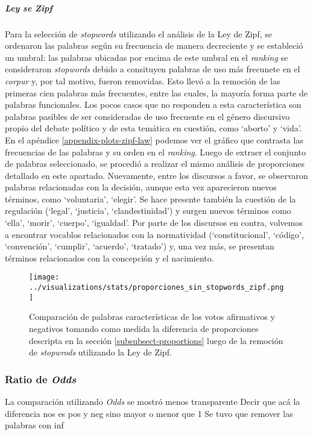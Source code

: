 \subparagraph{Ley se Zipf}
Para la selección de \textit{stopwords} utilizando el análisis de la Ley de Zipf,
se ordenaron las palabras según su frecuencia de manera decreciente y se estableció
un umbral: las palabras ubicadas por encima de este umbral en el \textit{ranking}
se consideraron \textit{stopwords} debido a consituyen palabras de uso más
frecunete en el \textit{corpur} y, por tal motivo, fueron removidas.
Esto llevó a la remoción de las primeras cien palabras más frecuentes, entre 
las cuales, la mayoría forma parte de palabras funcionales.
Los pocos casos que no responden a esta característica son palabras pasibles de
ser consideradas de uso frecuente en el género discursivo propio del debate político
y de esta temática en cuestión, como `aborto' y `vida'.
En el apéndice \ref{appendix-plots-zipf-law} podemos ver el gráfico que contrasta
las frecuencias de las palabras y su orden en el \textit{ranking}.
Luego de extraer el conjunto de palabras seleccionado, se procedió a realizar el
mismo análisis de proporciones detallado en este apartado. Nuevamente, entre
los discursos a favor, se observaron palabras relacionadas con la decisión, aunque
esta vez aparecieron nuevos términos, como `voluntaria', `elegir'. Se hace presente
también la cuestión de la regulación (`legal', `justicia', `clandestinidad') y
surgen nuevos términos como `ella', `morir', `cuerpo', `igualdad'.
Por parte de los discursos en contra, volvemos a encontrar vocablos relacionados
con la normatividad (`constitucional', `código', `convención', `cumplir', 
`acuerdo', `tratado') y, una vez más, se presentan términos relacionados
con la concepción y el nacimiento.

\begin{figure}[h!]
    \centering
    \texttt{[image: ../visualizations/stats/proporciones\_sin\_stopwords\_zipf.png]}
    \caption{Comparación de palabras características de los votos afirmativos y
    negativos tomando como medida la diferencia de proporciones descripta
    en la sección \ref{subsubsect-proportions} luego de la remoción de
    \textit{stopwrods} utilizando la Ley de Zipf.}
    \label{fig-statistics-proportions-zipf}
\end{figure}

\subsubsection{Ratio de \textit{Odds}}
La comparación utilizando \textit{Odds} se mostró menos transparente
Decir que acá la diferencia nos es pos y neg sino mayor o menor que 1
Se tuvo que remover las palabras con inf

